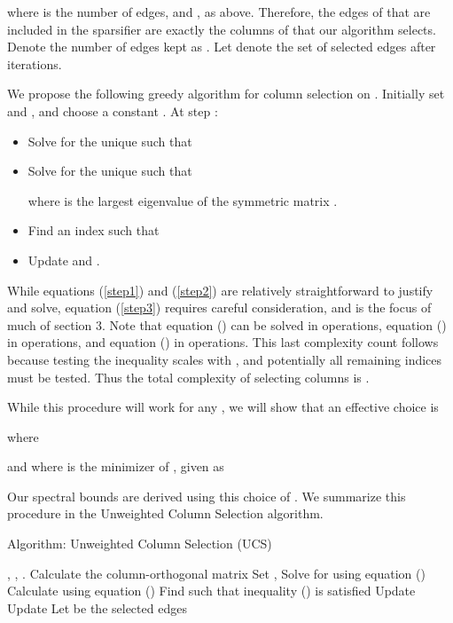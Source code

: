 \documentclass[final,leqno,onefignum,onetabnum]{siamltex1213}
\begin{document}
where  is the number of edges, and , as above. Therefore, the edges of  that
are included in the sparsifier are exactly the columns of  that our algorithm selects. Denote
the number of edges kept as .  Let  denote the set of selected edges after  iterations.

We propose the following greedy algorithm for column selection on .  Initially set  and , and
choose a constant . At step :
\begin{itemize}
\item Solve for the unique  such that

\item Solve for the unique  such that

where  is the  largest eigenvalue of the symmetric matrix .
\item Find an index  such that 

\item Update  and . 
\end{itemize}

While equations (\ref{step1}) and (\ref{step2}) are relatively straightforward to justify and solve, equation (\ref{step3}) requires careful consideration, and is the focus of much of section 3.  Note that equation () can be solved in  operations, equation () in  operations, and equation () in  operations.  This last complexity count follows because testing the inequality scales with , and potentially all remaining indices must be tested.  Thus the total complexity of selecting  columns is .

While this procedure will work for any , we will show that an effective choice is

where 

and where  is the minimizer of , given as

Our spectral bounds are derived using this choice of .  We summarize this procedure in the Unweighted Column Selection algorithm.

\begin{algorithm}
{\sc Algorithm: Unweighted Column Selection (UCS)}

\renewcommand{\algorithmicrequire}{\textbf{Inputs:}}
\renewcommand{\algorithmicensure}{\textbf{Outputs:}}
\renewcommand{\algorithmicprint}{\textbf{break}}
    \label{algo:unweighted}
    \begin{algorithmic}[1]
    \REQUIRE , , .
    \ENSURE 
    \STATE Calculate the column-orthogonal matrix 
    \STATE Set , 
    \FOR{}
        \STATE Solve for  using equation ()
        \STATE Calculate  using equation ()
        \STATE Find  such that inequality () is satisfied \label{find_i}
        \STATE Update 
        \STATE Update 
    \ENDFOR
		\STATE Let  be the selected edges
    \end{algorithmic}
\end{algorithm}
\end{document}
